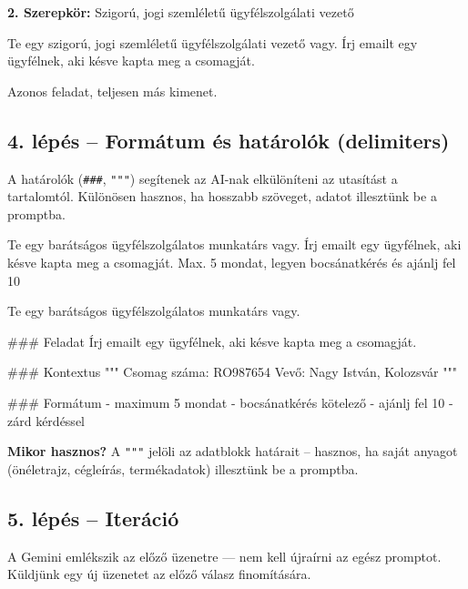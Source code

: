 \documentclass[11pt,a4paper]{article}
\newcommand{\tip}[1]{%
  \vspace{3pt}%
  \begin{tcolorbox}[tipstyle]%
  \textbf{\textcolor{tipborder}{Mikor hasznos?}} #1%
  \end{tcolorbox}\vspace{2pt}}
\newcommand{\lbl}[1]{\vspace{6pt}\noindent{\small\bfseries\textcolor{labelcolor}{#1}}\par\smallskip}
\begin{document}
\noindent\textbf{2. Szerepkör:} Szigorú, jogi szemléletű ügyfélszolgálati vezető

\begin{prompt}
Te egy szigorú, jogi szemléletű ügyfélszolgálati vezető vagy.
Írj emailt egy ügyfélnek, aki késve kapta meg a csomagját.
\end{prompt}

\noindent Azonos feladat, teljesen más kimenet.

\subsection{4. lépés -- Formátum és határolók (delimiters)}

\noindent A határolók (\texttt{\#\#\#}, \texttt{"""}) segítenek az AI-nak elkülöníteni az utasítást a tartalomtól. Különösen hasznos, ha hosszabb szöveget, adatot illesztünk be a promptba.

\lbl{Határolók nélkül}
\begin{prompt}
Te egy barátságos ügyfélszolgálatos munkatárs vagy. Írj emailt
egy ügyfélnek, aki késve kapta meg a csomagját. Max. 5 mondat,
legyen bocsánatkérés és ajánlj fel 10%
\end{prompt}

\lbl{Határolókkal strukturálva}
\begin{prompt}
Te egy barátságos ügyfélszolgálatos munkatárs vagy.

### Feladat
Írj emailt egy ügyfélnek, aki késve kapta meg a csomagját.

### Kontextus
"""
Csomag száma: RO987654
Vevő: Nagy István, Kolozsvár
"""

### Formátum
- maximum 5 mondat
- bocsánatkérés kötelező
- ajánlj fel 10%
- zárd kérdéssel
\end{prompt}

\tip{A \texttt{"""} jelöli az adatblokk határait -- hasznos, ha saját anyagot (önéletrajz, cégleírás, termékadatok) illesztünk be a promptba.}

\subsection{5. lépés -- Iteráció}

\noindent A Gemini emlékszik az előző üzenetre — nem kell újraírni az egész promptot. Küldjünk egy új üzenetet az előző válasz finomítására.
\end{document}
